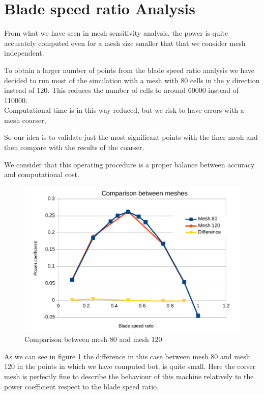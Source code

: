\documentclass[a4paper,12pt]{article}
\begin{document}
\section{Blade speed ratio Analysis}

From what we have seen in mesh sensitivity analysis, the power is quite accurately computed even for a mesh size smaller that that we consider mesh independent.

To obtain a larger number of points from the blade speed ratio analysis we have decided to run most of the simulation with a mesh with 80 cells in the y direction instead of 120. This reduces the number of cells to around 60000 instead of 110000. 
\\Computational time is in this way reduced, but we risk to have errors with a mesh coarser,

So our idea is to validate just the most significant points with the finer mesh and then compare with the results of the coarser.

We consider that this operating procedure is a proper balance between accuracy and computational cost.

\begin{figure}[hbtp]
\centering
\includegraphics[width=15cm]{images/bsr/bsr-mesh80-120.pdf}
\caption{Comparison between mesh 80 and mesh 120}
\label{fig:bsr-comparison-80-120}
\end{figure}

As we can see in figure \ref{fig:bsr-comparison-80-120} the difference in this case between mesh 80 and mesh 120 in the points in which we have computed bot, is quite small.
Here the corser mesh is perfectly fine to describe the behaviour of this machine relatively to the power coefficient respect to the blade speed ratio.
\end{document}
